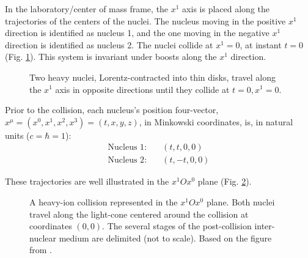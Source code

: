 In the laboratory/center of mass frame, the $x^1$ axis is placed along the trajectories of the centers of the nuclei. The nucleus moving in the positive $x^1$ direction is identified as nucleus 1, and the one moving in the negative $x^1$ direction is identified as nucleus 2. The nuclei collide at $x^1 = 0$, at instant $t=0$ (Fig. \ref{fig:HI_CM_coll_axis}). This system is invariant under boosts along the $x^1$ direction.


\begin{figure}
	\centering
	
	\caption{Two heavy nuclei, Lorentz-contracted into thin disks, travel along the $x^1$ axis in opposite directions until they collide at $t=0, x^1=0$.}
	\label{fig:HI_CM_coll_axis}
\end{figure}

Prior to the collision, each nucleus's position four-vector, $x^\mu = (x^0,x^1,x^2,x^3) = (t,x,y,z)$, in Minkowski coordinates, is, in natural units ($c=\hbar=1$):
\begin{equation*}
\begin{split}
	\text{Nucleus 1}:& \quad (t,t,0,0) \\
	\text{Nucleus 2}:& \quad (t,-t,0,0)
\end{split}
\end{equation*}

These trajectories are well illustrated in the $x^1Ox^0$ plane (Fig. \ref{fig:HIC_lightcone}). 


\begin{figure}
    \centering
    
    \caption{A heavy-ion collision represented in the $x^1Ox^0$ plane. Both nuclei travel along the light-cone centered around the collision at coordinates $(0,0)$. The several stages of the post-collision inter-nuclear medium are delimited (not to scale). Based on the figure from \cite{vanderschee2014}.}
    \label{fig:HIC_lightcone}
\end{figure}

